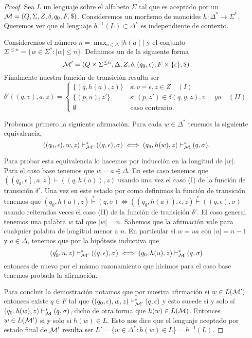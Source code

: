 \documentclass[tesis.tex]{subfiles}
\begin{document}
\begin{proof}
	Sea $L$ un lenguaje \ic sobre el alfabeto $\Sigma$ tal que es aceptado por un \APND ${\cal M } = (Q, \Sigma, Z, \delta, q_0, F, \$)$.
	Consideremos un morfismo de monoides $h: \Delta^* \to \Sigma^*$. 
	Queremos ver que el lenguaje $h^{-1}(L) \subset \Delta^*$ es independiente de contexto.
	 
	Consideremos el número $ n = \max_{a \in \Delta} |h(a)|$ y el conjunto $\Sigma^{\le n} = \{ w \in \Sigma^* : |w| \le n  \}$.	
	Definimos un \APND de la siguiente forma
	\[
	{\cal M' } = (Q \times \Sigma^{\le n}, \Delta, Z, \delta, (q_0, \epsilon), F \times \{ \epsilon \}, \$)
	\]
	Finalmente nuestra función de transición resulta ser 
	\[
	\delta'((q,v), a ,z) = 
	\begin{cases}
		\{(q,h(a), z )\}  \ &\text{si} \ v=\epsilon, z \in Z \quad (I)\\
		\{(p,u),z' \} \ &\text{si} \ (p,z') \in \delta(q,y,z), v=yu \quad (II) \\  
		\emptyset \ &\text{caso contrario}.
	\end{cases}
	\]
	
	Probemos primero la siguiente afirmación.
	Para cada $w \in \Delta^*$ tenemos la siguiente equivalencia,
	\[
	((q_0, \epsilon),w,z) \vdash^*_{\cal M'} ((q,\epsilon), \sigma) \iff (q_0,h(w), z) \vdash^*_{\cal M} (q, \sigma).
	\]
	
	Para probar esta equivalencia lo hacemos por inducción en la longitud de $|w|$.
	Para el caso base tenemos que $w = a \in \Delta$.
	En este caso tenemos que $((q_0, \epsilon), a, z) \vdash ((q,h(a)), z)$ usando una vez el caso (I) de la función de transición $\delta'$.
	Una vez en este estado por como definimos la función de transición tenemos que $ (q_0,h(a), z) \overset{*}{\vdash }(q, \sigma)  \iff ((q_0,h(a)), \epsilon ,z) \overset{*}{\vdash} ((q,\epsilon), \sigma)$ usando reiteradas veces el caso (II) de la función de transición $\delta'$.
	El caso general tenemos una palabra $w$ tal que $|w|=n$.
	Sabemos que la afirmación vale para cualquier palabra de longitud menor a $n$.
	En particular si $w=ua$ con $|u|=n-1$ y $a \in \Delta$, tenemos que por la hipótesis inductiva que 
	\[
	(q_0',u,z) \vdash^*_{\cal M'} ((q,\epsilon), \sigma) \iff (q_0,h(u), z) \vdash^*_{\cal M} (q, \sigma)
	\]
	entonces de nuevo por el mismo razonamiento que hicimos para el caso base tenemos probada la afirmación.
	
	Para concluir la demostración notamos que por nuestra afirmación si $w \in L(\cal M')$ entonces existe $q \in F$ tal que $ ((q_0, \epsilon),w,z) \vdash^*_{\cal M'} (q,\epsilon) $ y esto sucede sí y solo sí $(q_0,h(w), z) \vdash^*_{\cal M} (q, \sigma)$, dicho de otra forma que $h(w) \in L(\cal M)$.	
	Entonces $w \in L(\cal M')$ si y solo si $h(w) \in L$.
	Esto nos dice que el lenguaje aceptado por estado final de $\cal M'$ resulta ser $L' = \{ w \in \Delta^* : h(w) \in L \} = h^{-1}(L)$.
\end{proof}
\end{document}
